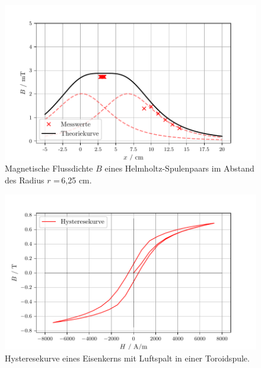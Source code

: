 \begin{figure}
  \centering
  \includegraphics{helmholtzR.pdf}
  \caption{Magnetische Flussdichte $B$ eines Helmholtz-Spulenpaars im Abstand des Radius $r$ =\,6,25 cm.}
  \label{fig:plot}
\end{figure}

\begin{figure}
  \centering
  \includegraphics{plothyst.pdf}
  \caption{Hysteresekurve eines Eisenkerns mit Luftspalt in einer Toroidspule.}
  \label{fig:plot}
\end{figure}
